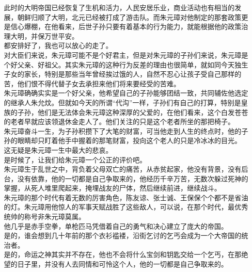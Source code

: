 \begin{multicols}{\theparacolNo}
此时的大明帝国已经恢复了生机和活力，人民安居乐业，商业活动也有相当的发展，朝鲜归顺了大明，北元已经被打成了游击队。而朱元璋对他制定的那套政策更是信心爆棚，在他看来，后世子孙只要有着基本的行为能力，就能根据他的政策治理大明，并保万世平安。\\

都安排好了，我也可以放心的走了。\\

对大臣们来说，朱元璋可能不是个好君主，但是对朱元璋的子孙们来说，朱元璋是个好父亲、好祖父。其实朱元璋的这种行为反差的理由也很简单，就如同今天独生子女的家长，特别是那些当年曾经挨过饿的人，自然不忍心让孩子受自己那样的苦，他们恨不得代替子女去承担来他们将来要经受的苦难。\\

朱元璋确确实实是一个好父亲，他希望自己的子孙能够团结一致，共同辅佐他选定的继承人朱允炆。但就如今天的所谓“代沟”一样，子孙们有自己的打算，特别是皇族的子孙，他们是无法体会朱元璋这种深厚的父爱的，在他们看来，这个白发苍苍的老者早就应该领退休金走人了。他们关注的只是这个老者所坐的那把椅子。\\

朱元璋奋斗一生，为子孙积攒下了大笔的财富，可当他走到人生的终点时，他的子孙的眼睛却只盯着他手中握着的那笔财富，投向这个老人的只是冷冰冰的目光。\\

这无疑是朱元璋一生中最大的悲哀。\\

是时候了，让我们给朱元璋一个公正的评价吧。\\

朱元璋生于乱世之中，背负着父母双亡的痛苦，从赤贫起家，他没有背景，没有后台，没有依靠，他的一切都是自己争取来的，他经历千辛万苦，无数次躲过死神的掌握，从死人堆里爬起来，掩埋战友的尸体，然后继续前进，继续战斗。\\

朱元璋的那个时代有着无数的厉害角色，陈友谅、张士诚、王保保个个都不是省油的灯。朱元璋用他惊人的军事天赋战胜了这些敌人，可以说，在那个时代，最优秀统帅的称号非朱元璋莫属。\\

他几乎是赤手空拳，单枪匹马凭借着自己的勇气和决心建立了庞大的帝国。\\

是的，谁会想到几十年前的那个衣衫褴褛，沿街乞讨的乞丐会成为一个大帝国的统治者。\\

是的，命运之神其实并不存在，他也不会将什么宝剑和钥匙交给一个乞丐，在那绝望的日子里，并没有人去同情和可怜这个人，他的一切都是自己争取来的。\\


\end{multicols}
